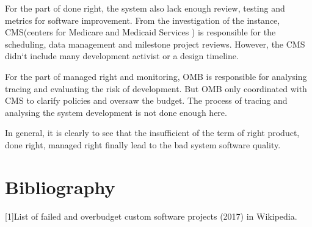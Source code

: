 \documentclass[11pt,twoside,a4paper]{article}
\begin{document}
For the part of done right, the system also lack enough review, testing and metrics for software improvement. From the investigation of the instance, CMS(centers for Medicare and Medicaid Services ) is responsible for the scheduling, data management and milestone project reviews. However, the CMS didn`t include many development activist or a design timeline. 

For the part of managed right and monitoring, OMB is responsible for analysing tracing and evaluating the risk of development. But OMB only coordinated with CMS to clarify policies and oversaw the budget. The process of tracing and analysing the system development is not done enough here. 

In general, it is clearly to see that the insufficient of the term of right product, done right, managed right finally lead to the bad system software quality. 



\section{Bibliography}
[1]List of failed and overbudget custom software projects (2017) in Wikipedia.
\end{document}
